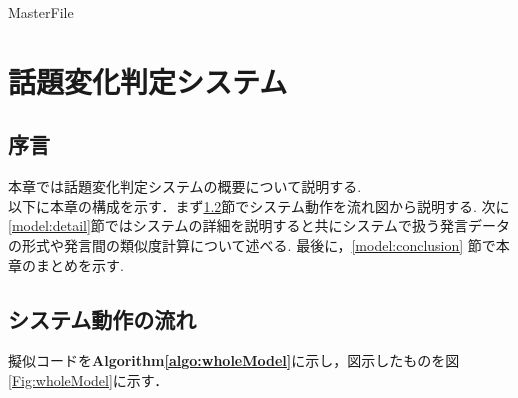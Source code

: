 \expandafter\ifx\csname MasterFile\endcsname\relax
	\def\SubFile{hoge}
  
  
	\setcounter{chapter}{2}
  \fi
  \cleardoublepage
\chapter{話題変化判定システム}
%
\label{model:chapter}

\section{序言}
\label{model:introduction}
本章では話題変化判定システムの概要について説明する. \\
以下に本章の構成を示す．まず\ref{model:wholeModel}節でシステム動作を流れ図から説明する. 次に\ref{model:detail}節ではシステムの詳細を説明すると共にシステムで扱う発言データの形式や発言間の類似度計算について述べる. 
最後に，\ref{model:conclusion} 節で本章のまとめを示す.

\section{システム動作の流れ}
\label{model:wholeModel}
擬似コードを\textbf{Algorithm\ref{algo:wholeModel}}に示し，図示したものを図\ref{Fig:wholeModel}に示す．

